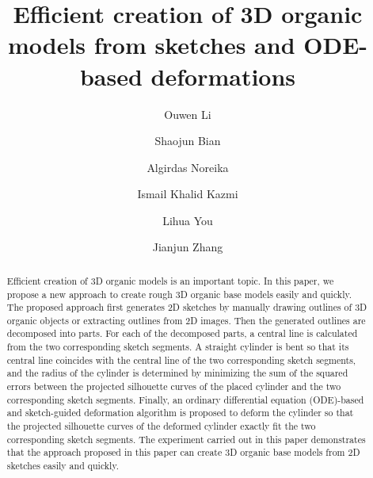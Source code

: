 \documentclass[runningheads]{llncs}
\begin{document}
%
\title{Efficient creation of 3D organic models from sketches and ODE-based deformations}
%
%
\author{Ouwen Li \and Shaojun Bian \and Algirdas Noreika \and Ismail Khalid Kazmi \and Lihua You \and Jianjun Zhang}
%
%
%
\maketitle              %
%
\begin{abstract}
Efficient creation of 3D organic models is an important topic. In this paper, we propose a new approach to create rough 3D organic base models easily and quickly. The proposed approach first generates 2D sketches by manually drawing outlines of 3D organic objects or extracting outlines from 2D images. Then the generated outlines are decomposed into parts. For each of the decomposed parts, a central line is calculated from the two corresponding sketch segments. A straight cylinder is bent so that its central line coincides with the central line of the two corresponding sketch segments, and the radius of the cylinder is determined by minimizing the sum of the squared errors between the projected silhouette curves of the placed cylinder and the two corresponding sketch segments. Finally, an ordinary differential equation (ODE)-based and sketch-guided deformation algorithm is proposed to deform the cylinder so that the projected silhouette curves of the deformed cylinder exactly fit the two corresponding sketch segments. The experiment carried out in this paper  demonstrates that the approach proposed in this paper can create 3D organic base models from 2D sketches easily and quickly.


\end{abstract}
%
%
%
\end{document}
